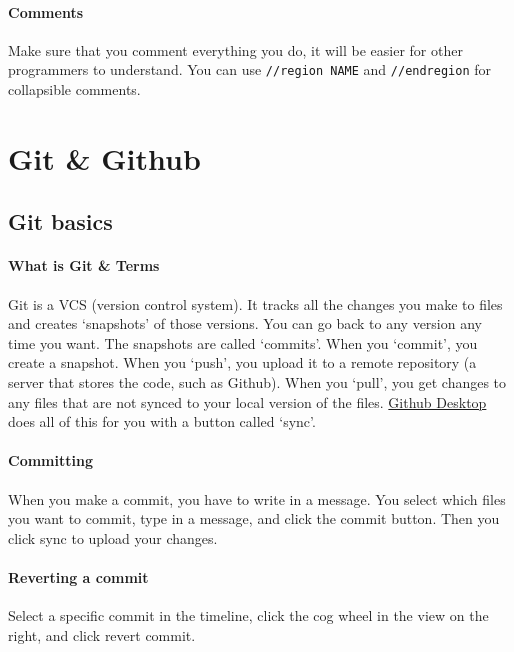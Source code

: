 \documentclass[12p,a4paper]{article}
\begin{document}
\paragraph{Comments} Make sure that you comment everything you do, it will be easier for other programmers to understand. You can use \verb!//region NAME! and \verb!//endregion! for collapsible comments.

\section{Git \& Github}
\subsection{Git basics}
\paragraph{What is Git \& Terms} Git is a VCS (version control system). It tracks all the changes you make to files and creates `snapshots' of those versions. You can go back to any version any time you want. The snapshots are called `commits'. When you `commit', you create a snapshot. When you `push', you upload it to a remote repository (a server that stores the code, such as Github). When you `pull', you get changes to any files that are not synced to your local version of the files. \href{https://desktop.github.com}{Github Desktop} does all of this for you with a button called `sync'. 

\paragraph{Committing} When you make a commit, you have to write in a message. You select which files you want to commit, type in a message, and click the commit button. Then you click sync to upload your changes.

\paragraph{Reverting a commit} Select a specific commit in the timeline, click the cog wheel in the view on the right, and click revert commit.
\end{document}
